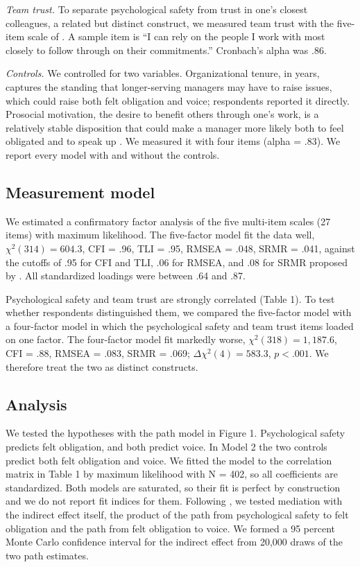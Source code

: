 \documentclass[12pt]{article}
\begin{document}
\textit{Team trust.} To separate psychological safety from trust in one's closest colleagues, a related but distinct construct, we measured team trust with the five-item scale of \citet{olumide2017}. A sample item is ``I can rely on the people I work with most closely to follow through on their commitments.'' Cronbach's alpha was .86.

\textit{Controls.} We controlled for two variables. Organizational tenure, in years, captures the standing that longer-serving managers may have to raise issues, which could raise both felt obligation and voice; respondents reported it directly. Prosocial motivation, the desire to benefit others through one's work, is a relatively stable disposition that could make a manager more likely both to feel obligated and to speak up \citep{tesfaye2014}. We measured it with four items (alpha = .83). We report every model with and without the controls.

\subsection{Measurement model}

We estimated a confirmatory factor analysis of the five multi-item scales (27 items) with maximum likelihood. The five-factor model fit the data well, $\chi^2(314) = 604.3$, CFI = .96, TLI = .95, RMSEA = .048, SRMR = .041, against the cutoffs of .95 for CFI and TLI, .06 for RMSEA, and .08 for SRMR proposed by \citet{hu1999}. All standardized loadings were between .64 and .87.

Psychological safety and team trust are strongly correlated (Table 1). To test whether respondents distinguished them, we compared the five-factor model with a four-factor model in which the psychological safety and team trust items loaded on one factor. The four-factor model fit markedly worse, $\chi^2(318) = 1{,}187.6$, CFI = .88, RMSEA = .083, SRMR = .069; $\Delta\chi^2(4) = 583.3$, $p < .001$. We therefore treat the two as distinct constructs.

\subsection{Analysis}

We tested the hypotheses with the path model in Figure 1. Psychological safety predicts felt obligation, and both predict voice. In Model 2 the two controls predict both felt obligation and voice. We fitted the model to the correlation matrix in Table 1 by maximum likelihood with N = 402, so all coefficients are standardized. Both models are saturated, so their fit is perfect by construction and we do not report fit indices for them. Following \citet{zhao2010}, we tested mediation with the indirect effect itself, the product of the path from psychological safety to felt obligation and the path from felt obligation to voice. We formed a 95 percent Monte Carlo confidence interval for the indirect effect from 20,000 draws of the two path estimates.
\end{document}

